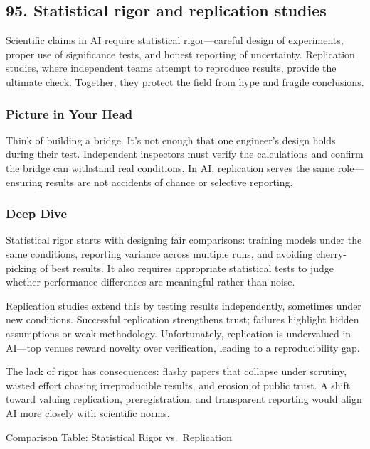 \documentclass[
  letterpaper,
  DIV=11,
  numbers=noendperiod]{scrreprt}
\begin{document}
\subsection{95. Statistical rigor and replication
studies}\label{statistical-rigor-and-replication-studies}

Scientific claims in AI require statistical rigor---careful design of
experiments, proper use of significance tests, and honest reporting of
uncertainty. Replication studies, where independent teams attempt to
reproduce results, provide the ultimate check. Together, they protect
the field from hype and fragile conclusions.

\subsubsection{Picture in Your Head}\label{picture-in-your-head-94}

Think of building a bridge. It's not enough that one engineer's design
holds during their test. Independent inspectors must verify the
calculations and confirm the bridge can withstand real conditions. In
AI, replication serves the same role---ensuring results are not
accidents of chance or selective reporting.

\subsubsection{Deep Dive}\label{deep-dive-94}

Statistical rigor starts with designing fair comparisons: training
models under the same conditions, reporting variance across multiple
runs, and avoiding cherry-picking of best results. It also requires
appropriate statistical tests to judge whether performance differences
are meaningful rather than noise.

Replication studies extend this by testing results independently,
sometimes under new conditions. Successful replication strengthens
trust; failures highlight hidden assumptions or weak methodology.
Unfortunately, replication is undervalued in AI---top venues reward
novelty over verification, leading to a reproducibility gap.

The lack of rigor has consequences: flashy papers that collapse under
scrutiny, wasted effort chasing irreproducible results, and erosion of
public trust. A shift toward valuing replication, preregistration, and
transparent reporting would align AI more closely with scientific norms.

Comparison Table: Statistical Rigor vs.~Replication
\end{document}
